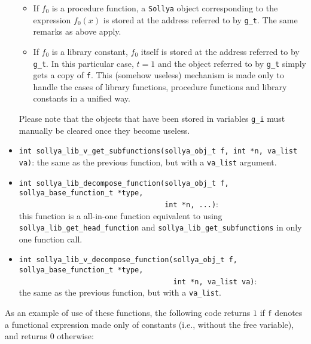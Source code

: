 \documentclass[a4paper]{article}
\newcommand{\sollya}{\texttt{Sollya}\xspace}
\begin{document}
\begin{itemize}
\begin{itemize}
  \item If $f_0$ is a procedure function, a \sollya object corresponding to the expression $f_0(x)$ is stored at the address referred to by \texttt{g\_t}. The same remarks as above apply.
  \item If $f_0$ is a library constant, $f_0$ itself is stored at the address referred to by \texttt{g\_t}. In this particular case, $t=1$ and the object referred to by \texttt{g\_t} simply gets a copy of \texttt{f}. This (somehow useless) mechanism is made only to handle the cases of library functions, procedure functions and library constants in a unified way.
  \end{itemize}
Please note that the objects that have been stored in variables \texttt{g\_i} must manually be cleared once they become useless.

\item \verb|int sollya_lib_v_get_subfunctions(sollya_obj_t f, int *n, va_list va)|: the same as the previous function, but with a \texttt{va\_list} argument.
\item \verb|int sollya_lib_decompose_function(sollya_obj_t f, sollya_base_function_t *type,|\\
      \verb|                                  int *n, ...)|:\\
this function is a all-in-one function equivalent to using \verb|sollya_lib_get_head_function| and \verb|sollya_lib_get_subfunctions| in only one function call.
\item \verb|int sollya_lib_v_decompose_function(sollya_obj_t f, sollya_base_function_t *type,|\\
      \verb|                                    int *n, va_list va)|:\\
the same as the previous function, but with a \texttt{va\_list}.
\end{itemize}

As an example of use of these functions, the following code returns $1$ if \texttt{f} denotes a functional expression made only of constants (i.e., without the free variable), and returns $0$ otherwise:
\end{document}
